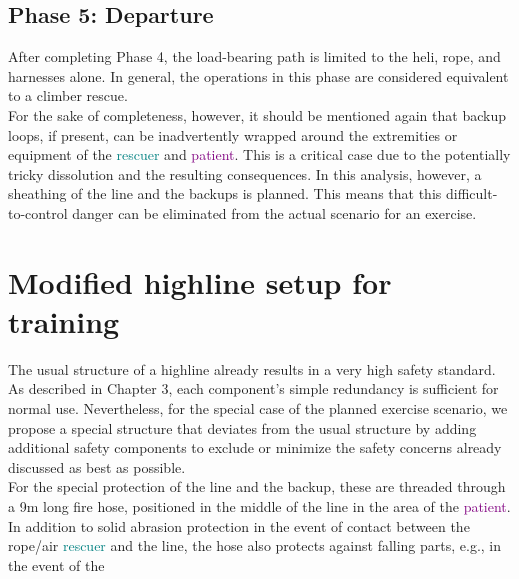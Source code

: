 \documentclass[a4paper,10pt]{scrartcl}
\begin{document}
\clearpage
\subsection{Phase 5: Departure}
\label{sec:fha:phase5}

After completing Phase 4, the load-bearing path is limited to the heli, rope, and harnesses alone. In general, the operations in this phase are considered equivalent to a climber rescue.\\
For the sake of completeness, however, it should be mentioned again that backup loops, if present, can be inadvertently wrapped around the extremities or equipment of the \textcolor{teal}{rescuer} and \textcolor{purple}{patient}. This is a critical case due to the potentially tricky dissolution and the resulting consequences. In this analysis, however, a sheathing of the line and the backups is planned. This means that this difficult-to-control danger can be eliminated from the actual scenario for an exercise.


\section{Modified highline setup for training}
\label{sec:modified}

The usual structure of a highline already results in a very high safety standard. As described in Chapter 3, each component's simple redundancy is sufficient for normal use. Nevertheless, for the special case of the planned exercise scenario, we propose a special structure that deviates from the usual structure by adding additional safety components to exclude or minimize the safety concerns already discussed as best as possible.\\
For the special protection of the line and the backup, these are threaded through a 9m long fire hose, positioned in the middle of the line in the area of the \textcolor{purple}{patient}. In addition to solid abrasion protection in the event of contact between the rope/air \textcolor{teal}{rescuer} and the line, the hose also protects against falling parts, e.g., in the event of the
\end{document}
